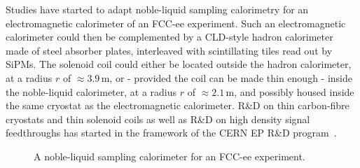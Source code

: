 Studies have started to adapt noble-liquid sampling calorimetry for an electromagnetic calorimeter of an FCC-ee experiment. Such an electromagnetic calorimeter could then be complemented by a CLD-style hadron calorimeter made of steel absorber plates, interleaved with scintillating tiles read out by SiPMs. The solenoid coil could either be located outside the hadron calorimeter, at a radius $r$ of $\approx 3.9\,\mathrm{m}$, or - provided the coil can be made thin enough - inside the noble-liquid calorimeter, at a radius $r$ of $\approx 2.1\,\mathrm{m}$, and possibly housed inside the same cryostat as the electromagnetic calorimeter. R\&D on thin carbon-fibre cryostats and thin solenoid coils as well as R\&D on high density signal feedthroughs has started in the framework of the CERN EP R\&D program~\cite{Aleksa:2649646}. 



\begin{figure}
\centering
{}
\caption{A noble-liquid sampling calorimeter for an FCC-ee experiment.}\label{fig:calo-fccee}
\end{figure}

